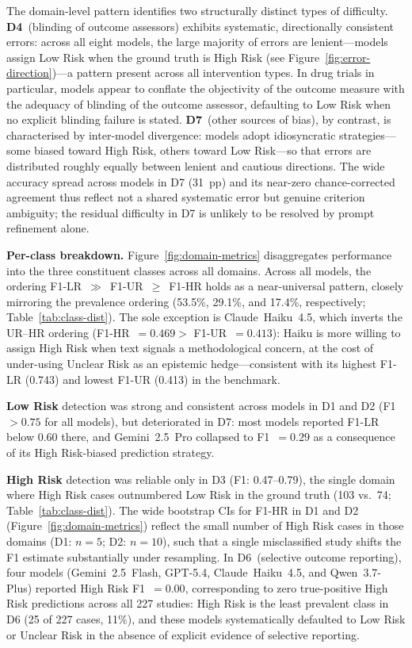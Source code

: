 \documentclass[../main.tex]{subfiles}
\begin{document}
The domain-level pattern identifies two structurally distinct types of
difficulty.
\textbf{D4}~(blinding of outcome assessors) exhibits systematic, directionally
consistent errors: across all eight models, the large majority of errors are
lenient---models assign Low Risk when the ground truth is High Risk (see
Figure~\ref{fig:error-direction})---a pattern present across all intervention
types.
In drug trials in particular, models appear to conflate the objectivity of the
outcome measure with the adequacy of blinding of the outcome assessor,
defaulting to Low Risk when no explicit blinding failure is stated.
\textbf{D7}~(other sources of bias), by contrast, is characterised by
inter-model divergence: models adopt idiosyncratic strategies---some biased
toward High Risk, others toward Low Risk---so that errors are distributed roughly
equally between lenient and cautious directions.
The wide accuracy spread across models in D7 (31~pp) and its near-zero
chance-corrected agreement thus reflect not a shared systematic error but genuine
criterion ambiguity; the residual difficulty in D7 is unlikely to be resolved by
prompt refinement alone.

\textbf{Per-class breakdown.}
Figure~\ref{fig:domain-metrics} disaggregates performance into the three
constituent classes across all domains.
Across all models, the ordering F1-LR~$\gg$~F1-UR~$\geq$~F1-HR holds as a
near-universal pattern, closely mirroring the prevalence ordering
(53.5\%, 29.1\%, and 17.4\%, respectively; Table~\ref{tab:class-dist}).
The sole exception is Claude~Haiku~4.5, which inverts the UR--HR ordering
(F1-HR~$= 0.469 >$ F1-UR~$= 0.413$): Haiku is more willing to assign High Risk
when text signals a methodological concern, at the cost of under-using Unclear
Risk as an epistemic hedge---consistent with its highest F1-LR (0.743) and
lowest F1-UR (0.413) in the benchmark.

\textbf{Low Risk} detection was strong and consistent across models in D1 and D2
(F1 $> 0.75$ for all models), but deteriorated in D7: most models reported
F1-LR below 0.60 there, and Gemini~2.5~Pro collapsed to F1~$= 0.29$ as a
consequence of its High Risk-biased prediction strategy.

\textbf{High Risk} detection was reliable only in D3 (F1: 0.47--0.79), the
single domain where High Risk cases outnumbered Low Risk in the ground truth
(103 vs.\ 74; Table~\ref{tab:class-dist}).
The wide bootstrap CIs for F1-HR in D1 and D2
(Figure~\ref{fig:domain-metrics}) reflect the small number of High Risk cases
in those domains (D1: $n = 5$; D2: $n = 10$), such that a single
misclassified study shifts the F1 estimate substantially under resampling.
In D6~(selective outcome reporting), four models (Gemini~2.5~Flash, GPT-5.4,
Claude~Haiku~4.5, and Qwen~3.7-Plus) reported High Risk F1~$= 0.00$,
corresponding to zero true-positive High Risk predictions across all 227 studies:
High Risk is the least prevalent class in D6 (25 of 227 cases, 11\%), and these
models systematically defaulted to Low Risk or Unclear Risk in the absence of
explicit evidence of selective reporting.
\end{document}
